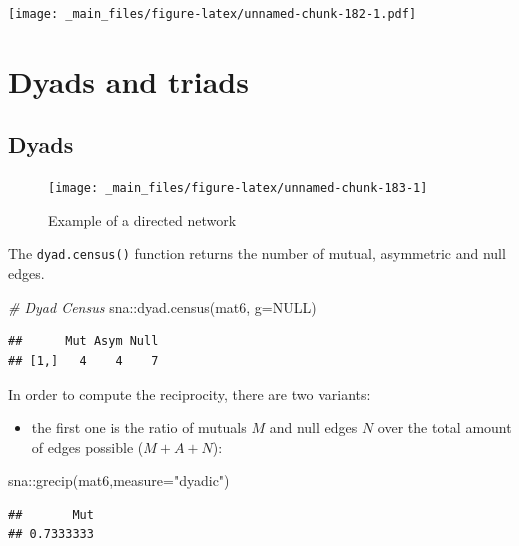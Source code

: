\documentclass[
  notitlepage,
  onecolumn,
  openany]{book}
\newenvironment{Shaded}{\begin{snugshade}}{\end{snugshade}}
\newcommand{\AttributeTok}[1]{\textcolor[rgb]{0.77,0.63,0.00}{#1}}
\newcommand{\CommentTok}[1]{\textcolor[rgb]{0.56,0.35,0.01}{\textit{#1}}}
\newcommand{\ConstantTok}[1]{\textcolor[rgb]{0.00,0.00,0.00}{#1}}
\newcommand{\FunctionTok}[1]{\textcolor[rgb]{0.00,0.00,0.00}{#1}}
\newcommand{\NormalTok}[1]{#1}
\newcommand{\SpecialCharTok}[1]{\textcolor[rgb]{0.00,0.00,0.00}{#1}}
\newcommand{\StringTok}[1]{\textcolor[rgb]{0.31,0.60,0.02}{#1}}
\providecommand{\tightlist}{%
  \setlength{\itemsep}{0pt}\setlength{\parskip}{0pt}}
\begin{document}
\texttt{[image: \_main\_files/figure-latex/unnamed-chunk-182-1.pdf]}

\hypertarget{dyads-and-triads}{%
\chapter{Dyads and triads}\label{dyads-and-triads}}

\hypertarget{dyads-1}{%
\section{Dyads}\label{dyads-1}}

\begin{figure}
\texttt{[image: \_main\_files/figure-latex/unnamed-chunk-183-1]} \caption{Example of a directed network}\label{fig:unnamed-chunk-183}
\end{figure}

The \texttt{dyad.census()} function returns the number of mutual, asymmetric and null edges.

\begin{Shaded}
\begin{Highlighting}[]
\CommentTok{\# Dyad Census}
\NormalTok{sna}\SpecialCharTok{::}\FunctionTok{dyad.census}\NormalTok{(mat6, }\AttributeTok{g=}\ConstantTok{NULL}\NormalTok{)}
\end{Highlighting}
\end{Shaded}

\begin{verbatim}
##      Mut Asym Null
## [1,]   4    4    7
\end{verbatim}

In order to compute the reciprocity, there are two variants:

\begin{itemize}
\tightlist
\item
  the first one is the ratio of mutuals \(M\) and null edges \(N\) over the total amount of edges possible (\(M+A+N\)):
\end{itemize}

\begin{Shaded}
\begin{Highlighting}[]
\NormalTok{sna}\SpecialCharTok{::}\FunctionTok{grecip}\NormalTok{(mat6,}\AttributeTok{measure=}\StringTok{"dyadic"}\NormalTok{)}
\end{Highlighting}
\end{Shaded}

\begin{verbatim}
##       Mut 
## 0.7333333
\end{verbatim}
\end{document}
